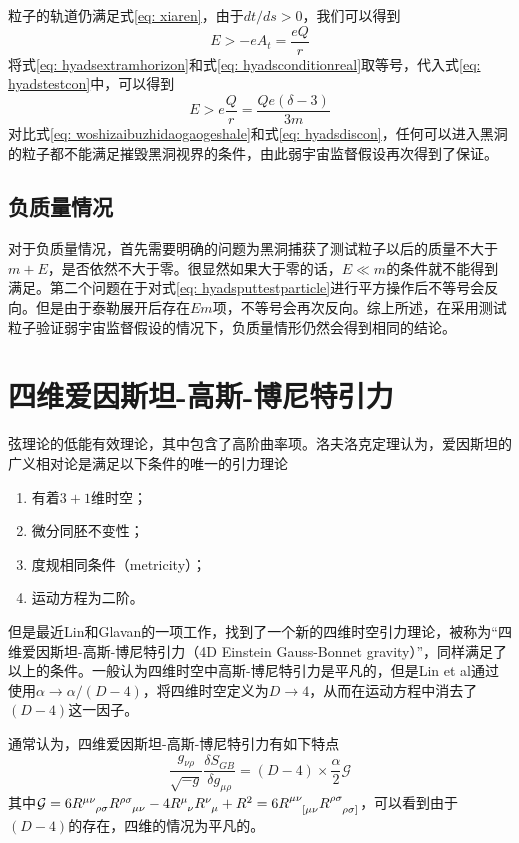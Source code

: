粒子的轨道仍满足式\eqref{eq: xiaren}，由于$dt/ds>0$，我们可以得到
\begin{equation}\label{eq: hyadstestcon}
    E>-eA_t=\frac{eQ}{r}
\end{equation}
将式\eqref{eq: hyadsextramhorizon}和式\eqref{eq: hyadsconditionreal}取等号，代入式\eqref{eq: hyadstestcon}中，可以得到
\begin{equation}\label{eq: woshizaibuzhidaogaogeshale}
    E > e\frac{Q}{r}=\frac{Q e \left(\delta-3\right)}{3 m} 
\end{equation}
对比式\eqref{eq: woshizaibuzhidaogaogeshale}和式\eqref{eq: hyadsdiscon}，任何可以进入黑洞的粒子都不能满足摧毁黑洞视界的条件，由此弱宇宙监督假设再次得到了保证。
\subsection{负质量情况}
对于负质量情况，首先需要明确的问题为黑洞捕获了测试粒子以后的质量不大于$m+E$，是否依然不大于零。很显然如果大于零的话，$E \ll m$的条件就不能得到满足。第二个问题在于对式\eqref{eq: hyadsputtestparticle}进行平方操作后不等号会反向。但是由于泰勒展开后存在$E m $项，不等号会再次反向。综上所述，在采用测试粒子验证弱宇宙监督假设的情况下，负质量情形仍然会得到相同的结论。

\section{四维爱因斯坦-高斯-博尼特引力}
弦理论的低能有效理论，其中包含了高阶曲率项。洛夫洛克定理认为，爱因斯坦的广义相对论是满足以下条件的唯一的引力理论\citep{lanczos1938remarkable,lovelock1971einstein,lovelock1972four}
\begin{enumerate}
    \item 有着$3+1$维时空；
    \item 微分同胚不变性；
    \item 度规相同条件（metricity）；
    \item 运动方程为二阶。
\end{enumerate}

但是最近Lin和Glavan的一项工作，找到了一个新的四维时空引力理论，被称为“四维爱因斯坦-高斯-博尼特引力（4D Einstein Gauss-Bonnet gravity）”，同样满足了以上的条件\citep{glavan2020einstein}。一般认为四维时空中高斯-博尼特引力是平凡的，但是Lin et al通过使用$\alpha\rightarrow \alpha/\left(D-4\right)$，将四维时空定义为$D\rightarrow 4$，从而在运动方程中消去了$\left(D-4\right)$这一因子。

通常认为，四维爱因斯坦-高斯-博尼特引力有如下特点
\begin{equation}
    \frac{g_{\nu \rho}}{\sqrt{-g}}\frac{\delta S_{GB}}{\delta g_{\mu \rho}}=\left(D-4\right)\times \frac{\alpha}{2}\mathcal{G}
\end{equation}
其中$\mathcal{G}=6R\indices{^{\mu \nu}_{\rho \sigma}}R\indices{^{\rho \sigma}_{\mu \nu}}-4R\indices{^{\mu}_{\nu}}R\indices{^{\nu}_{\mu}}+R^2=6R\indices{^{\mu \nu}_{[\mu \nu}}R\indices{^{\rho \sigma}_{\rho \sigma]}}$，可以看到由于$\left(D-4\right)$的存在，四维的情况为平凡的。

